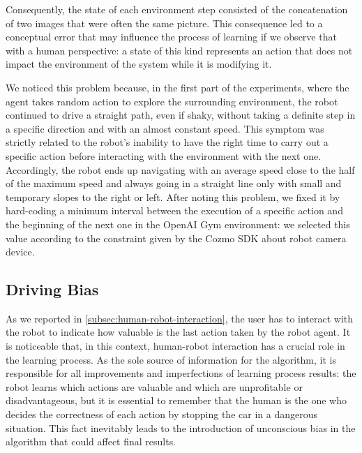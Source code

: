 Consequently, the state of each environment step consisted of the concatenation of two images that were often the same picture.
This consequence led to a conceptual error that may influence the process of learning if we observe that with a human perspective: a state of this kind represents an action that does not impact the environment of the system while it is modifying it.

We noticed this problem because, in the first part of the experiments, where the agent takes random action to explore the surrounding environment, the robot continued to drive a straight path, even if shaky, without taking a definite step in a specific direction and with an almost constant speed.
This symptom was strictly related to the robot's inability to have the right time to carry out a specific action before interacting with the environment with the next one.
Accordingly, the robot ends up navigating with an average speed close to the half of the maximum speed and always going in a straight line only with small and temporary slopes to the right or left.
After noting this problem, we fixed it by hard-coding a minimum interval between the execution of a specific action and the beginning of the next one in the OpenAI Gym environment: we selected this value according to the constraint given by the Cozmo SDK about robot camera device.

\subsection{Driving Bias}

As we reported in \vref{subsec:human-robot-interaction}, the user has to interact with the robot to indicate how valuable is the last action taken by the robot agent.
It is noticeable that, in this context, human-robot interaction has a crucial role in the learning process.
As the sole source of information for the algorithm, it is responsible for all improvements and imperfections of learning process results: the robot learns which actions are valuable and which are unprofitable or disadvantageous, but it is essential to remember that the human is the one who decides the correctness of each action by stopping the car in a dangerous situation.
This fact inevitably leads to the introduction of unconscious bias in the algorithm that could affect final results.

